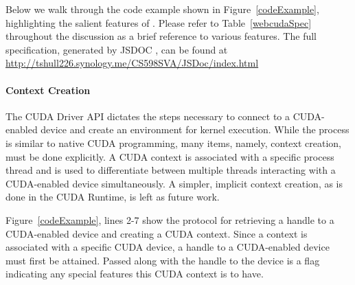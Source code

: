 Below we walk through the code example shown in Figure~\ref{codeExample},
highlighting the salient features of \namens. Please refer to
Table~\ref{webcudaSpec} throughout the discussion as a brief reference to
various \name features. The full \name specification, generated by JSDOC
\cite{JSDOC}, can be found at
\url{http://tshull226.synology.me/CS598SVA/JSDoc/index.html}


\lstset{ language=HTML5, numbers=left, stepnumber=1 }
\begin{figure*}
	\begin{center}
		\small
		
	\end{center}
	\caption{Simple \name Example}
	\label{codeExample}
\end{figure*}

\paragraph{Context Creation} The CUDA Driver API dictates the steps necessary to
connect to a CUDA-enabled device and create an environment for kernel execution.
While the process is similar to native CUDA programming, many items, namely,
context creation, must be done explicitly. A CUDA context is associated with a
specific process thread and is used to differentiate between multiple
threads interacting with a CUDA-enabled device simultaneously.  A simpler, implicit context creation, as is
done in the CUDA Runtime, is left as future work.

Figure~\ref{codeExample}, lines 2-7 show the protocol for
retrieving a handle to a CUDA-enabled device and creating a CUDA context. Since
a context is associated with a specific CUDA device, a handle to a CUDA-enabled
device must first be attained. Passed along with the handle to the device is a
flag indicating any special features this CUDA context is to have.

